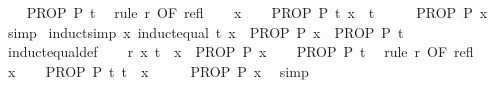 \begin{isabellebody}
\ \ \isamarkupfalse%
\ {\isachardoublequoteopen}PROP\ P\ t{\isachardoublequoteclose}\ \isamarkupfalse%
\ {\isacharparenleft}{\kern0pt}rule\ r\ {\isacharbrackleft}{\kern0pt}OF\ refl{\isacharbrackright}{\kern0pt}{\isacharparenright}{\kern0pt}\isanewline
{}\isamarkupfalse%
\isanewline
\ \ \isamarkupfalse%
\ x\isanewline
\ \ \isamarkupfalse%
\ {\isachardoublequoteopen}PROP\ P\ t{\isachardoublequoteclose}\ {\isachardoublequoteopen}x\ {\isacharequal}{\kern0pt}\ t{\isachardoublequoteclose}\isanewline
\ \ \isamarkupfalse%
\ \isamarkupfalse%
\ {\isachardoublequoteopen}PROP\ P\ x{\isachardoublequoteclose}\ \isamarkupfalse%
\ simp\isanewline
{}\isamarkupfalse%
%
\endisatagproof
{\isafoldproof}%
%
\isadelimproof
\isanewline
%
\endisadelimproof
\isanewline
{}\isamarkupfalse%
\ {\isacharbrackleft}{\kern0pt}induct{\isacharunderscore}{\kern0pt}simp{\isacharbrackright}{\kern0pt}{\isacharcolon}{\kern0pt}\ {\isachardoublequoteopen}{\isacharparenleft}{\kern0pt}{\isasymAnd}x{\isachardot}{\kern0pt}\ induct{\isacharunderscore}{\kern0pt}equal\ t\ x\ {\isasymLongrightarrow}\ PROP\ P\ x{\isacharparenright}{\kern0pt}\ {\isasymequiv}\ PROP\ P\ t{\isachardoublequoteclose}\isanewline
%
\isadelimproof
\ \ %
\endisadelimproof
%
\isatagproof
{}\isamarkupfalse%
\ induct{\isacharunderscore}{\kern0pt}equal{\isacharunderscore}{\kern0pt}def\isanewline
{}\isamarkupfalse%
\isanewline
\ \ \isamarkupfalse%
\ r{\isacharcolon}{\kern0pt}\ {\isachardoublequoteopen}{\isasymAnd}x{\isachardot}{\kern0pt}\ t\ {\isacharequal}{\kern0pt}\ x\ {\isasymLongrightarrow}\ PROP\ P\ x{\isachardoublequoteclose}\isanewline
\ \ \isamarkupfalse%
\ {\isachardoublequoteopen}PROP\ P\ t{\isachardoublequoteclose}\ \isamarkupfalse%
\ {\isacharparenleft}{\kern0pt}rule\ r\ {\isacharbrackleft}{\kern0pt}OF\ refl{\isacharbrackright}{\kern0pt}{\isacharparenright}{\kern0pt}\isanewline
{}\isamarkupfalse%
\isanewline
\ \ \isamarkupfalse%
\ x\isanewline
\ \ \isamarkupfalse%
\ {\isachardoublequoteopen}PROP\ P\ t{\isachardoublequoteclose}\ {\isachardoublequoteopen}t\ {\isacharequal}{\kern0pt}\ x{\isachardoublequoteclose}\isanewline
\ \ \isamarkupfalse%
\ \isamarkupfalse%
\ {\isachardoublequoteopen}PROP\ P\ x{\isachardoublequoteclose}\ \isamarkupfalse%
\ simp\isanewline
{}\isamarkupfalse%

\end{isabellebody}
